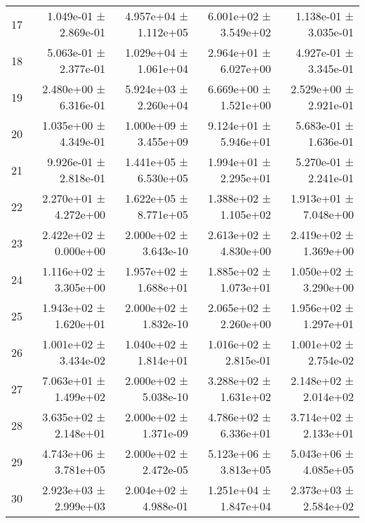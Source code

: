 \begin{table}[htbp]
\begin{tabular}{lrrrr}
17 & 1.049e-01 ± 2.869e-01 & 4.957e+04 ± 1.112e+05 & 6.001e+02 ± 3.549e+02 & 1.138e-01 ± 3.035e-01 \\
18 & 5.063e-01 ± 2.377e-01 & 1.029e+04 ± 1.061e+04 & 2.964e+01 ± 6.027e+00 & 4.927e-01 ± 3.345e-01 \\
19 & 2.480e+00 ± 6.316e-01 & 5.924e+03 ± 2.260e+04 & 6.669e+00 ± 1.521e+00 & 2.529e+00 ± 2.921e-01 \\
20 & 1.035e+00 ± 4.349e-01 & 1.000e+09 ± 3.455e+09 & 9.124e+01 ± 5.946e+01 & 5.683e-01 ± 1.636e-01 \\
21 & 9.926e-01 ± 2.818e-01 & 1.441e+05 ± 6.530e+05 & 1.994e+01 ± 2.295e+01 & 5.270e-01 ± 2.241e-01 \\
22 & 2.270e+01 ± 4.272e+00 & 1.622e+05 ± 8.771e+05 & 1.388e+02 ± 1.105e+02 & 1.913e+01 ± 7.048e+00 \\
23 & 2.422e+02 ± 0.000e+00 & 2.000e+02 ± 3.643e-10 & 2.613e+02 ± 4.830e+00 & 2.419e+02 ± 1.369e+00 \\
24 & 1.116e+02 ± 3.305e+00 & 1.957e+02 ± 1.688e+01 & 1.885e+02 ± 1.073e+01 & 1.050e+02 ± 3.290e+00 \\
25 & 1.943e+02 ± 1.620e+01 & 2.000e+02 ± 1.832e-10 & 2.065e+02 ± 2.260e+00 & 1.956e+02 ± 1.297e+01 \\
26 & 1.001e+02 ± 3.434e-02 & 1.040e+02 ± 1.814e+01 & 1.016e+02 ± 2.815e-01 & 1.001e+02 ± 2.754e-02 \\
27 & 7.063e+01 ± 1.499e+02 & 2.000e+02 ± 5.038e-10 & 3.288e+02 ± 1.631e+02 & 2.148e+02 ± 2.014e+02 \\
28 & 3.635e+02 ± 2.148e+01 & 2.000e+02 ± 1.371e-09 & 4.786e+02 ± 6.336e+01 & 3.714e+02 ± 2.133e+01 \\
29 & 4.743e+06 ± 3.781e+05 & 2.000e+02 ± 2.472e-05 & 5.123e+06 ± 3.813e+05 & 5.043e+06 ± 4.085e+05 \\
30 & 2.923e+03 ± 2.999e+03 & 2.004e+02 ± 4.988e-01 & 1.251e+04 ± 1.847e+04 & 2.373e+03 ± 2.584e+02 \\
    \bottomrule
    \end{tabular}
    \end{table}